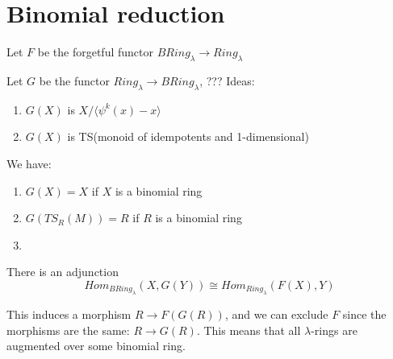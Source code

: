 
\section{Binomial reduction}

\begin{definition}
  Let $F$ be the forgetful functor $BRing_\lambda \to Ring_\lambda$
\end{definition}

\begin{definition}
  Let $G$ be the functor $Ring_\lambda \to BRing_\lambda$, ??? Ideas:
  \begin{enumerate}
    \item $G(X)$ is $X/\langle\psi^k(x) - x\rangle$
    \item $G(X)$ is TS(monoid of idempotents and 1-dimensional)
  \end{enumerate}
\end{definition}

\begin{proposition}
  We have:
  \begin{enumerate}
    \item $G(X) = X$ if $X$ is a binomial ring
    \item $G(TS_R(M)) = R$ if $R$ is a binomial ring
    \item 
  \end{enumerate}
\end{proposition}

\begin{theorem}
  There is an adjunction $$Hom_{BRing_\lambda}(X, G(Y)) \cong Hom_{Ring_\lambda}(F(X), Y)$$
\end{theorem}

\begin{corollary}
  This induces a morphism $R \to F(G(R))$, and we can exclude $F$ since the morphisms are the same: $R \to G(R)$. This means that all $\lambda$-rings are augmented over some binomial ring. 
\end{corollary}

